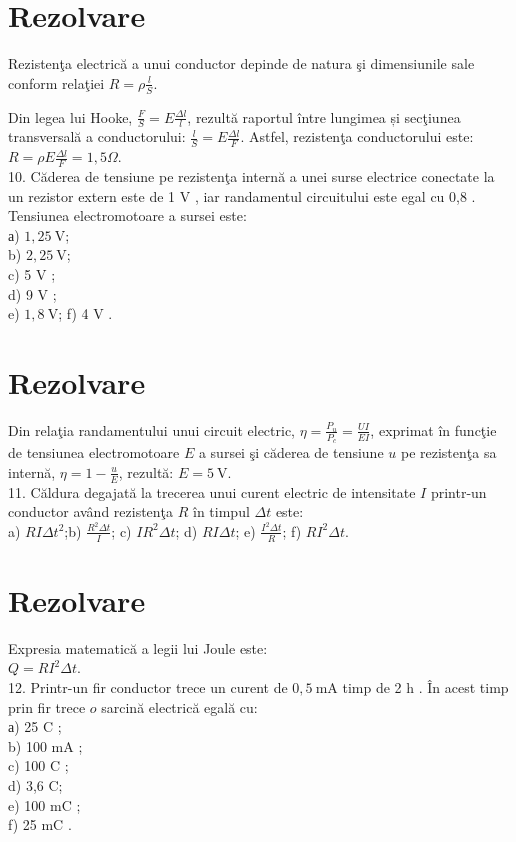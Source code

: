 \section*{Rezolvare}
Rezistenţa electrică a unui conductor depinde de natura şi dimensiunile sale conform relaţiei $R=\rho \frac{l}{S}$.

Din legea lui Hooke, $\frac{F}{S}=E \frac{\Delta l}{l}$, rezultă raportul între lungimea și secţiunea transversală a conductorului: $\frac{l}{S}=E \frac{\Delta l}{F}$. Astfel, rezistenţa conductorului este:\\
$R=\rho E \frac{\Delta l}{F}=1,5 \Omega$.\\
10. Căderea de tensiune pe rezistenţa internă a unei surse electrice conectate la un rezistor extern este de 1 V , iar randamentul circuitului este egal cu 0,8 . Tensiunea electromotoare a sursei este:\\
а) $1,25 \mathrm{~V}$;\\
b) $2,25 \mathrm{~V}$;\\
c) 5 V ;\\
d) 9 V ;\\
e) $1,8 \mathrm{~V}$; f) 4 V .

\section*{Rezolvare}
Din relaţia randamentului unui circuit electric, $\eta=\frac{P_{u}}{P_{c}}=\frac{U I}{E I}$, exprimat în funcţie de tensiunea electromotoare $E$ a sursei şi căderea de tensiune $u$ pe rezistenţa sa internă, $\eta=1-\frac{u}{E}$, rezultă: $E=5 \mathrm{~V}$.\\
11. Căldura degajată la trecerea unui curent electric de intensitate $I$ printr-un conductor având rezistenţa $R$ în timpul $\Delta t$ este:\\
a) $R I \Delta t^{2}$;b) $\frac{R^{2} \Delta t}{I}$; c) $I R^{2} \Delta t$; d) $R I \Delta t$; e) $\frac{I^{2} \Delta t}{R}$; f) $R I^{2} \Delta t$.

\section*{Rezolvare}
Expresia matematică a legii lui Joule este:\\
$Q=R I^{2} \Delta t$.\\
12. Printr-un fir conductor trece un curent de $0,5 \mathrm{~mA}$ timp de 2 h . În acest timp prin fir trece $o$ sarcină electrică egală cu:\\
а) 25 C ;\\
b) 100 mA ;\\
c) 100 C ;\\
d) 3,6 C;\\
e) 100 mC ;\\
f) 25 mC .


